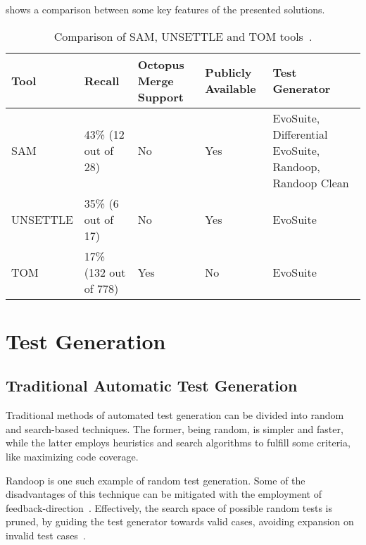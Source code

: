  shows a comparison between some key features of the presented solutions.


\begin{table}[!h]
\setlength\extrarowheight{2pt}
\begin{tabularx}{\textwidth}{|p{} | 
p{} | p{} | p{}  | p{}|}
 \hline
 Tool & Recall & Octopus Merge Support & Publicly Available & Test Generator \\ [0.5ex] 
 \hline\hline
  SAM & 43\% \newline (12 out of 28) & No & Yes & EvoSuite, Differential EvoSuite, Randoop, Randoop Clean \\ 
 \hline
  UNSETTLE & 35\% \newline (6 out of 17) & No & Yes & EvoSuite \\
 \hline
   TOM & 17\% \newline (132 out of 778) & Yes & No & EvoSuite \\ [1ex] 
 \hline
\end{tabularx}
\caption{\label{table:tool-comparison}Comparison of SAM, UNSETTLE and TOM tools~\cite{kn:leuson2,kn:nuno,kn:ji2022}.}
\end{table}



\section{Test Generation}

\subsection{Traditional Automatic Test Generation}

Traditional methods of automated test generation can be divided into random and search-based techniques. The former, being random, is simpler and faster, while the latter employs heuristics and search algorithms to fulfill some criteria, like maximizing code coverage.

Randoop is one such example of random test generation. Some of the disadvantages of this technique can be mitigated with the employment of feedback-direction~\cite{kn:randoop}. Effectively, the search space of possible random tests is pruned, by guiding the test generator towards valid cases, avoiding expansion on invalid test cases~\cite{kn:randoop}.

